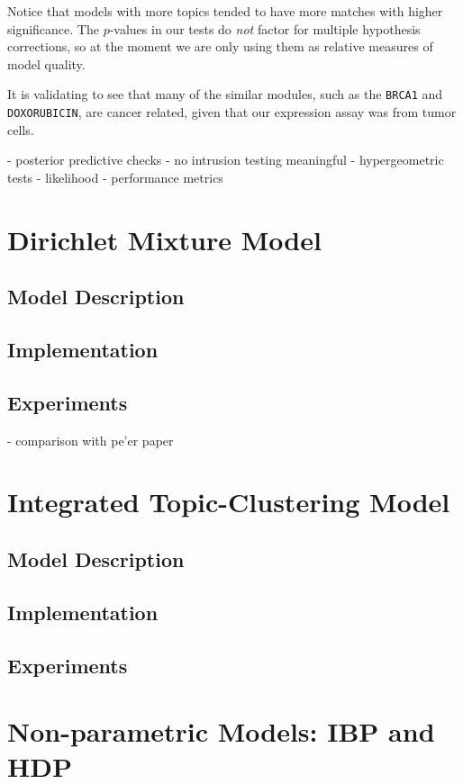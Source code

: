 \documentclass{article}
\begin{document}
Notice that models with more topics tended to have more matches with higher significance. The $p$-values in our tests do \textit{not} factor for multiple hypothesis corrections, so at the moment we are only using them as relative measures of model quality.

It is validating to see that many of the similar modules, such as the \texttt{BRCA1} and \texttt{DOXORUBICIN}, are cancer related, given that our expression assay was from tumor cells.

- posterior predictive checks
- no intrusion testing meaningful
- hypergeometric tests
- likelihood
- performance metrics

\section{Dirichlet Mixture Model} 
\label{mmsec}
\subsection{Model Description} 
\subsection{Implementation} 
\subsection{Experiments}  
- comparison with pe'er paper



\section{Integrated Topic-Clustering Model} 
\label{intsec}
\subsection{Model Description} 
\subsection{Implementation} 
\subsection{Experiments} 



\section{Non-parametric Models: IBP and HDP} 
\label{nonparametricsec}
\end{document}
